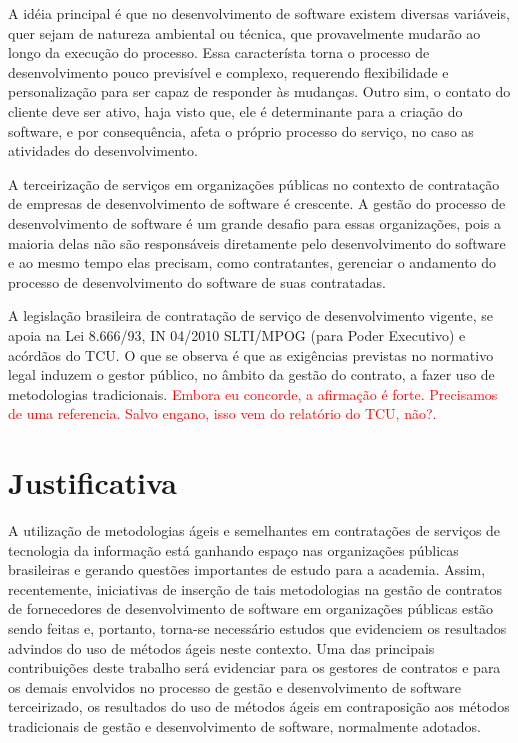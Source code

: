 A idéia principal é que no desenvolvimento de software existem diversas variáveis, quer sejam de natureza ambiental ou técnica, que provavelmente mudarão ao longo da execução do processo. Essa característa torna o processo de desenvolvimento pouco previsível e complexo, requerendo flexibilidade e personalização para ser capaz de responder às mudanças. Outro sim, o contato do cliente deve ser ativo, haja visto que, ele é determinante para a criação do software, e por consequência, afeta o próprio processo do serviço, no caso as atividades do desenvolvimento.

A terceirização de serviços em organizações públicas no contexto de contratação de empresas de desenvolvimento de software é crescente. A gestão do processo de desenvolvimento de software é um grande desafio para essas organizações, pois a maioria delas não são responsáveis diretamente pelo desenvolvimento do software e ao mesmo tempo elas precisam, como contratantes, gerenciar o andamento do processo de desenvolvimento do software de suas contratadas. 

A legislação brasileira de contratação de serviço de desenvolvimento vigente, se apoia na Lei 8.666/93, IN 04/2010 SLTI/MPOG (para Poder Executivo) e acórdãos do TCU. O que se observa é que as exigências previstas no normativo legal induzem o gestor público, no âmbito da gestão do contrato, a fazer uso de metodologias tradicionais.
\textcolor{red}{{Embora eu concorde, a afirmação é forte. Precisamos de uma referencia. Salvo engano, isso vem do relatório do TCU, não?.}}



\section[Justificativa]{Justificativa}

A utilização de metodologias ágeis e semelhantes em contratações de serviços de tecnologia da informação está ganhando espaço nas organizações públicas brasileiras e gerando questões importantes de estudo para a academia. Assim, recentemente, iniciativas de inserção de tais metodologias na gestão de contratos de fornecedores de desenvolvimento de software em organizações públicas estão sendo feitas e, portanto, torna-se necessário estudos que evidenciem os resultados advindos do uso de métodos ágeis neste contexto. Uma das principais contribuições deste trabalho será evidenciar para os gestores de contratos e para os demais envolvidos no processo de gestão e desenvolvimento de software terceirizado, os resultados do uso de métodos ágeis em contraposição aos métodos tradicionais de gestão e desenvolvimento de software, normalmente adotados. 

